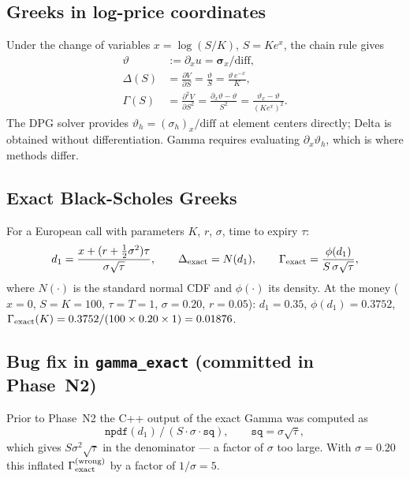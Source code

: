 \documentclass[11pt,a4paper]{article}
\newcommand{\vth}{\vartheta}
\begin{document}
\subsection{Greeks in log-price coordinates}

Under the change of variables $x = \log(S/K)$, $S = Ke^x$, the chain rule gives
\begin{align}
  \vth &:= \partial_x u = \boldsymbol{\sigma}_x / \mathrm{diff},
  \label{eq:vth}\\
  \Delta(S) &= \frac{\partial V}{\partial S}
             = \frac{\vth}{S} = \frac{\vth\,e^{-x}}{K},
  \label{eq:delta}\\
  \Gamma(S) &= \frac{\partial^2 V}{\partial S^2}
             = \frac{\partial_x\vth - \vth}{S^2}
             = \frac{\vth_x - \vth}{(Ke^x)^2}.
  \label{eq:gamma}
\end{align}
The DPG solver provides $\vth_h = (\sigma_h)_x / \mathrm{diff}$ at element centers
directly; Delta is obtained without differentiation.
Gamma requires evaluating $\partial_x\vth_h$, which is where methods differ.

\subsection{Exact Black-Scholes Greeks}

For a European call with parameters $K$, $r$, $\sigma$, time to expiry $\tau$:
\[
  d_1 = \frac{x + (r + \tfrac{1}{2}\sigma^2)\tau}{\sigma\sqrt{\tau}},
  \qquad
  \Delta_{\rm exact} = N(d_1),
  \qquad
  \Gamma_{\rm exact} = \frac{\phi(d_1)}{S\,\sigma\sqrt{\tau}},
\]
where $N(\cdot)$ is the standard normal CDF and $\phi(\cdot)$ its density.
At the money ($x=0$, $S=K=100$, $\tau=T=1$, $\sigma=0.20$, $r=0.05$):
$d_1 = 0.35$, $\phi(d_1) = 0.3752$,
$\Gamma_{\rm exact}(K) = 0.3752/(100 \times 0.20 \times 1) = 0.01876$.

\subsection{Bug fix in \texttt{gamma\_exact} (committed in Phase~N2)}
\label{sec:bugfix}

Prior to Phase~N2 the C++ output of the exact Gamma was computed as
\[
  \texttt{npdf}(d_1)\,/\,(S \cdot \sigma \cdot \texttt{sq}),
  \qquad \texttt{sq} = \sigma\sqrt{\tau},
\]
which gives $S\sigma^2\sqrt{\tau}$ in the denominator --- a factor of $\sigma$
too large.  With $\sigma = 0.20$ this inflated
$\Gamma_{\rm exact}^{\rm (wrong)}$ by a factor of $1/\sigma = 5$.
\end{document}
